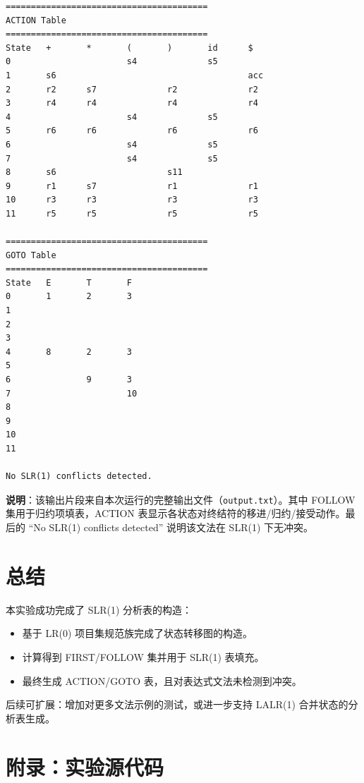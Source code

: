 \documentclass[12pt,a4paper]{ctexart}
\begin{document}
\begin{verbatim}
========================================
ACTION Table
========================================
State   +       *       (       )       id      $       
0                       s4              s5              
1       s6                                      acc     
2       r2      s7              r2              r2      
3       r4      r4              r4              r4      
4                       s4              s5              
5       r6      r6              r6              r6      
6                       s4              s5              
7                       s4              s5              
8       s6                      s11                     
9       r1      s7              r1              r1      
10      r3      r3              r3              r3      
11      r5      r5              r5              r5      

========================================
GOTO Table
========================================
State   E       T       F       
0       1       2       3       
1                               
2                               
3                               
4       8       2       3       
5                               
6               9       3       
7                       10      
8                               
9                               
10                              
11                              

No SLR(1) conflicts detected.
\end{verbatim}
\textbf{说明}：该输出片段来自本次运行的完整输出文件（\texttt{output.txt}）。其中 FOLLOW 集用于归约项填表，ACTION 表显示各状态对终结符的移进/归约/接受动作。最后的 ``No SLR(1) conflicts detected'' 说明该文法在 SLR(1) 下无冲突。

\section{总结}
本实验成功完成了 SLR(1) 分析表的构造：
\begin{itemize}
	\item 基于 LR(0) 项目集规范族完成了状态转移图的构造。
	\item 计算得到 FIRST/FOLLOW 集并用于 SLR(1) 表填充。
	\item 最终生成 ACTION/GOTO 表，且对表达式文法未检测到冲突。
\end{itemize}
后续可扩展：增加对更多文法示例的测试，或进一步支持 LALR(1) 合并状态的分析表生成。

\section*{附录：实验源代码}
\end{document}

